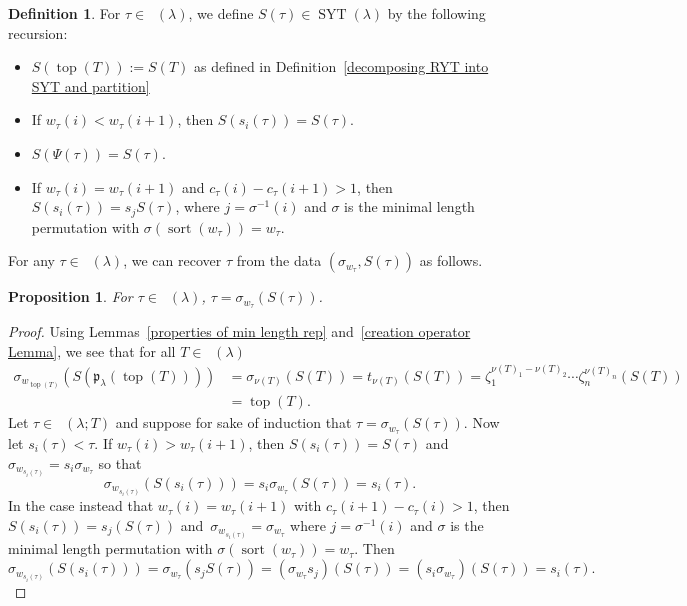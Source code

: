 \documentclass[10pt,a4paper]{amsart}
\numberwithin{equation}{section}
\newtheorem{Proposition}[Theorem]{Proposition}
\theoremstyle{definition}
\newtheorem{Definition}[Theorem]{Definition}
\DeclareMathOperator{\RYT}{\mathrm{RYT}_{\geq 0}}
\DeclareMathOperator{\SYT}{\mathrm{SYT}}
\DeclareMathOperator{\PSYT}{\mathrm{PSYT}_{\geq 0}}
\DeclareMathOperator{\sort}{sort}
\DeclareMathOperator{\Top}{\mathrm{top}}
\begin{document}
\begin{Definition}\label{tableaux from PSYT def}
 For $\tau \in \PSYT(\lambda)$, we define $S(\tau) \in \SYT(\lambda)$ by the following recursion:
 \begin{itemize}\itemsep=0pt
 \item $S(\Top(T)) := S(T)$ as defined in Definition~\ref{decomposing RYT into SYT and partition}
 \item If $w_{\tau}(i) < w_{\tau}(i+1)$, then $S(s_i(\tau))= S(\tau)$.
 \item $S(\Psi(\tau)) = S(\tau)$.
 \item If $w_{\tau}(i) = w_{\tau}(i+1)$ and $c_{\tau}(i) - c_{\tau}(i+1)>1$, then $S(s_i(\tau))= s_jS(\tau)$, where $j = \sigma^{-1}(i)$ and $\sigma$ is the minimal length permutation with $\sigma(\sort(w_{\tau})) = w_{\tau}$.
 \end{itemize}
\end{Definition}

For any $\tau \in \PSYT(\lambda)$, we can recover $\tau$ from the data $(\sigma_{w_{\tau}}, S(\tau))$ as follows.

\begin{Proposition}\label{generating PSYT from SYT}
 For $\tau \in \PSYT(\lambda)$,
 $\tau = \sigma_{w_{\tau}}(S(\tau))$.
\end{Proposition}
\begin{proof}
 Using Lemmas~\ref{properties of min length rep} and~\ref{creation operator Lemma}, we see that for all $T \in \RYT(\lambda)$
 \begin{align*}
 \sigma_{w_{\Top(T)}}(S(\mathfrak{p}_{\lambda}(\Top(T))))& = \sigma_{\nu(T)}(S(T)) = t_{\nu(T)}(S(T)) = \zeta_1^{\nu(T)_1 - \nu(T)_2}\cdots \zeta_n^{\nu(T)_{n}}(S(T)) \\
 &= \Top(T).
 \end{align*}
 Let $\tau \in \PSYT(\lambda;T)$ and suppose for sake of induction that $\tau = \sigma_{w_{\tau}}(S(\tau))$. Now let $s_i(\tau) < \tau$. If $w_{\tau}(i) > w_{\tau}(i+1)$, then $S(s_i(\tau)) = S(\tau)$ and $\sigma_{w_{s_i(\tau)}}= s_i\sigma_{w_{\tau}}$ so that
 \[
 \sigma_{w_{s_i(\tau)}}(S(s_i(\tau))) = s_i\sigma_{w_{\tau}}(S(\tau)) = s_i(\tau).
 \]
 In the case instead that $w_{\tau}(i) = w_{\tau}(i+1)$ with $c_{\tau}(i+1)-c_{\tau}(i) > 1$, then $S(s_i(\tau)) = s_j(S(\tau))$ and~${\sigma_{w_{s_i(\tau)}} = \sigma_{w_{\tau}}}$ where $j = \sigma^{-1}(i)$ and $\sigma$ is the minimal length permutation with $\sigma(\sort(w_{\tau})) = w_{\tau}$.
 Then
 \[
 \sigma_{w_{s_i(\tau)}}(S(s_i(\tau)))=\sigma_{w_{\tau}}(s_jS(\tau))= (\sigma_{w_{\tau}}s_j)(S(\tau))= (s_i\sigma_{w_{\tau}})(S(\tau))= s_i(\tau).\tag*{\qed}
 \] \renewcommand{\qed}{}
\end{proof}
\end{document}
